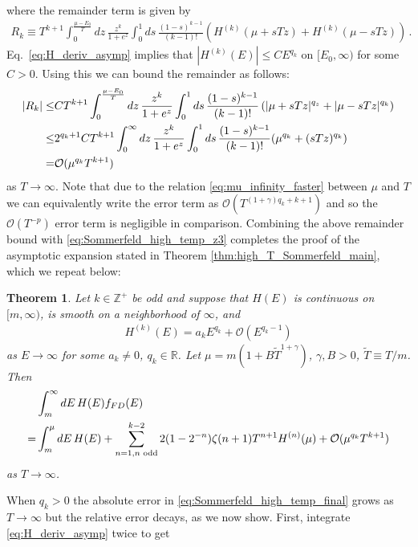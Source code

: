 \documentclass[sn-mathphys,Numbered]{sn-jnl}
\newtheorem{theorem}{Theorem}
\begin{document}
where the remainder term is given by
\begin{align}
    R_k\equiv T^{k+1}\int_0^{\frac{\mu-E_0}{T}} dz \,\frac{z^k}{1+e^{z}}
 \int_0^1 ds\, \frac{(1-s)^{k-1}}{(k-1)!} (H^{(k)}(\mu+sTz)+H^{(k)}(\mu-sTz))\,.
\end{align}
Eq.~\eqref{eq:H_deriv_asymp} implies that $|H^{(k)}(E)|\leq CE^{q_k}$ on $[E_0,\infty)$ for some $C>0$. Using this we can bound the remainder as follows:
\begin{align}
    |R_k|\leq &CT^{k+1}\int_0^{\frac{\mu-E_0}{T}} dz \,\frac{z^k}{1+e^{z}}
 \int_0^1 ds\, \frac{(1-s)^{k-1}}{(k-1)!} \left(|\mu+sTz|^{q_z}+|\mu-sTz|^{q_k}\right)\notag\\
 \leq&2^{q_k+1}CT^{k+1}\int_0^{\infty} dz \,\frac{z^k}{1+e^{z}}\notag
 \int_0^1 ds\, \frac{(1-s)^{k-1}}{(k-1)!} (\mu^{q_k}+(sTz)^{q_k})\notag\\
 =&\mathcal{O}(\mu^{q_k}T^{k+1})\label{eq:Sommerfeld_high_T_remainder_bound}
\end{align}
as $T\to\infty$.  Note that due to the  relation \eqref{eq:mu_infinity_faster} between $\mu$ and $T$ we can equivalently write the error term as $\mathcal{O}(T^{(1+\gamma)q_k+k+1})$ and so the $\mathcal{O}(T^{-p})$ error term is negligible in comparison. Combining the above remainder bound with \eqref{eq:Sommerfeld_high_temp_z3} completes the proof of the asymptotic expansion stated in Theorem \ref{thm:high_T_Sommerfeld_main}, which we repeat below:
\begin{theorem}\label{thm:high_T_Sommerfeld}
Let $k\in\mathbb{Z}^+$ be odd and suppose that $H(E)$ is continuous on $[m,\infty)$, is smooth on a neighborhood of $\infty$, and
\begin{align}
  H^{(k)}(E)=a_kE^{q_k}+\mathcal{O}(E^{q_k-1})  
\end{align}
as $E\to \infty$ for some $a_k\neq 0$, $q_k\in\mathbb{R}$.  Let $\mu=m(1+B\widetilde{T}^{1+\gamma})$, $\gamma,B>0$, $\widetilde{T}\equiv T/m$. Then
\begin{align}
    &\int_m^\infty dE\, H(E)f_{FD}(E)\notag\\
=&\int_m^\mu dE\, H(E)+\sum_{n=1,n\text{ odd}}^{k-2} 2(1-2^{-n})\zeta(n+1)T^{n+1}H^{(n)}(\mu)+\mathcal{O}(\mu^{q_k}T^{k+1})\label{eq:Sommerfeld_high_temp_final}
\end{align}
as $T\to\infty$.
\end{theorem}
When $q_k>0$ the absolute error in \eqref{eq:Sommerfeld_high_temp_final}  grows as $T\to\infty$ but the relative error decays, as we now show.  First, integrate \eqref{eq:H_deriv_asymp} twice to get
\end{document}
